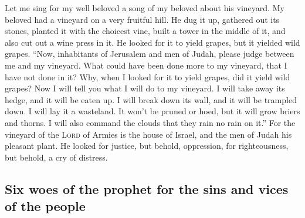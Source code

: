  Let me sing for my well beloved a song of my beloved
about his vineyard. My beloved had a vineyard on a very fruitful hill.
 He dug it up, gathered out its stones, planted it with
the choicest vine, built a tower in the middle of it, and also cut out a
wine press in it. He looked for it to yield grapes, but it yielded wild
grapes.  ``Now, inhabitants of Jerusalem and men of Judah,
please judge between me and my vineyard.  What could have
been done more to my vineyard, that I have not done in it? Why, when I
looked for it to yield grapes, did it yield wild grapes? 
Now I will tell you what I will do to my vineyard. I will take away its
hedge, and it will be eaten up. I will break down its wall, and it will
be trampled down.  I will lay it a wasteland. It won't be
pruned or hoed, but it will grow briers and thorns. I will also command
the clouds that they rain no rain on it.''  For the
vineyard of the \textsc{Lord} of Armies is the house of Israel, and the
men of Judah his pleasant plant. He looked for justice, but behold,
oppression, for righteousness, but behold, a cry of distress.

\hypertarget{six-woes-of-the-prophet-for-the-sins-and-vices-of-the-people}{%
\subsection{Six woes of the prophet for the sins and vices of the
people}\label{six-woes-of-the-prophet-for-the-sins-and-vices-of-the-people}}

